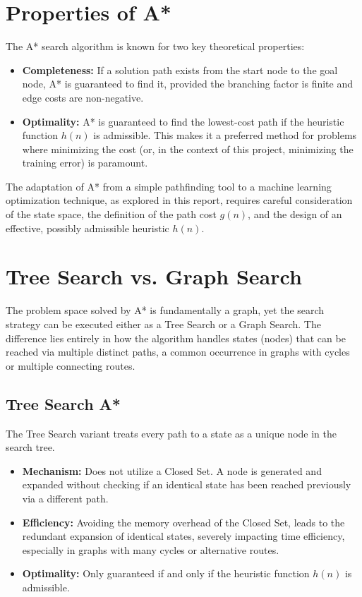 \section{Properties of A*}
The A* search algorithm is known for two key theoretical properties:

\begin{itemize}
    \item \textbf{Completeness:} If a solution path exists from the start node to the goal node, A* is guaranteed to find it, provided the branching factor is finite and edge costs are non-negative.
    \item \textbf{Optimality:} A* is guaranteed to find the lowest-cost path if the heuristic function $h(n)$ is admissible. This makes it a preferred method for problems where minimizing the cost (or, in the context of this project, minimizing the training error) is paramount.
\end{itemize}

The adaptation of A* from a simple pathfinding tool to a machine learning optimization technique, as explored in this report, requires careful consideration of the state space, the definition of the path cost $g(n)$, and the design of an effective, possibly admissible heuristic $h(n)$.




\section{Tree Search vs. Graph Search}
\label{sec:tree_vs_graph}

The problem space solved by A* is fundamentally a graph, yet the search strategy can be executed either as a Tree Search or a Graph Search. The difference lies entirely in how the algorithm handles states (nodes) that can be reached via multiple distinct paths, a common occurrence in graphs with cycles or multiple connecting routes.

\subsection{Tree Search A*}
The Tree Search variant treats every path to a state as a unique node in the search tree.

\begin{itemize}
    \item \textbf{Mechanism:} Does not utilize a Closed Set. A node is generated and expanded without checking if an identical state has been reached previously via a different path.
    \item \textbf{Efficiency:} Avoiding the memory overhead of the Closed Set, leads to the redundant expansion of identical states, severely impacting time efficiency, especially in graphs with many cycles or alternative routes.
    \item \textbf{Optimality:} Only guaranteed if and only if the heuristic function $h(n)$ is admissible.
\end{itemize}


